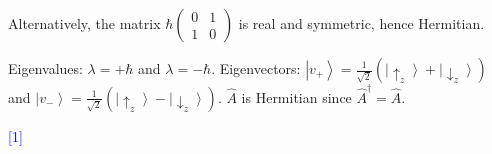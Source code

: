 \documentclass[12pt,a4paper]{article}
\newcommand{\markstep}[1]{\hfill\textcolor{blue}{[#1]}}
\newcommand{\finalanswer}[1]{%
  \begin{tcolorbox}[colback=green!5!white,colframe=green!50!black,boxrule=0.5pt]
  #1
  \end{tcolorbox}
}
\renewcommand{\ket}[1]{\left|#1\right\rangle}
\begin{document}
\begin{parts}
Alternatively, the matrix $\hbar\begin{pmatrix} 0 & 1 \\ 1 & 0 \end{pmatrix}$ is real and symmetric, hence Hermitian.

\finalanswer{Eigenvalues: $\lambda = +\hbar$ and $\lambda = -\hbar$. Eigenvectors: $\ket{v_+} = \frac{1}{\sqrt{2}}(\ket{\!\uparrow_z} + \ket{\!\downarrow_z})$ and $\ket{v_-} = \frac{1}{\sqrt{2}}(\ket{\!\uparrow_z} - \ket{\!\downarrow_z})$. $\hat{A}$ is Hermitian since $\hat{A}^\dagger = \hat{A}$.}
\markstep{1}

\end{parts}
\end{document}

